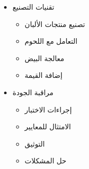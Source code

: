 \begin{itemize}
\begin{itemize}
        \item تقنيات التصنيع
        \begin{itemize}
            \item تصنيع منتجات الألبان
            \item التعامل مع اللحوم
            \item معالجة البيض
            \item إضافة القيمة
        \end{itemize}
        
        \item مراقبة الجودة
        \begin{itemize}
            \item إجراءات الاختبار
            \item الامتثال للمعايير
            \item التوثيق
            \item حل المشكلات
        \end{itemize}
    \end{itemize}
\end{itemize}

